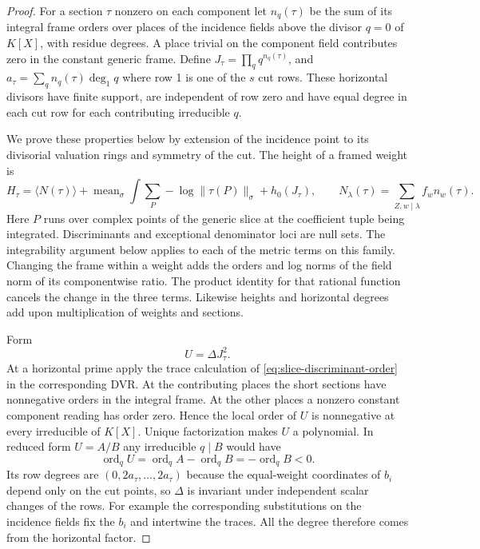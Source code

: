 \begin{proof}
For a section \(\tau\) nonzero on each component let
\(n_q(\tau)\) be the sum of its integral frame orders over
places of the incidence fields above the divisor \(q=0\)
of \(K[X]\), with residue degrees. A place trivial on the
component field contributes zero in the constant generic
frame. Define \(J_\tau=\prod_q q^{n_q(\tau)}\), and
\(a_\tau=\sum_q n_q(\tau)\deg_1 q\) where row 1 is one
of the \(s\) cut rows. These horizontal divisors have finite support, are independent
of row zero and have equal degree in each cut row for each
contributing irreducible \(q\).

We prove these properties
below by extension of the incidence point to its divisorial
valuation rings and symmetry of the cut. The height of a framed
weight is
\[
 H_\tau=\langle N(\tau)\rangle
       +\operatorname{mean}_{\sigma}\int
            \sum_{P}-\log\|\tau(P)\|_\sigma
       +h_0(J_\tau),\qquad
 N_\lambda(\tau)=\sum_{Z,w\mid\lambda} f_w n_w(\tau).
\]
Here \(P\) runs over complex points of the generic slice
at the coefficient tuple being integrated. Discriminants
and exceptional denominator loci are null sets. The integrability argument below applies to each of the
metric terms on this family.
Changing the frame within a weight adds the orders and
log norms of the field norm of its componentwise ratio.
The product identity for that rational function cancels
the change in the three terms. Likewise heights and
horizontal degrees add upon multiplication of weights
and sections. \label{cor:slice-heights-1}

Form 
\[
  U=\Delta J_\tau^2.
\]
 At a horizontal prime apply
the trace calculation of \eqref{eq:slice-discriminant-order}
in the corresponding DVR. At the contributing places the
short sections have nonnegative orders in the integral
frame. At the other places a nonzero constant component
reading has order zero. Hence the local order of \(U\)
is nonnegative at every irreducible of \(K[X]\). Unique
factorization makes \(U\) a polynomial.
In reduced form \(U=A/B\) any irreducible \(q\mid B\) would have
\[
  \operatorname{ord}_q U=\operatorname{ord}_q A-\operatorname{ord}_q B=-\operatorname{ord}_q B<0 .
\]
 Its row degrees
are \((0,2a_\tau,\ldots,2a_\tau)\) because the equal-weight
coordinates of \(b_i\) depend only on the cut points, so \(\Delta\) is invariant under
independent scalar changes of the rows. For example the
corresponding substitutions on the incidence fields fix the
\(b_i\) and intertwine the traces. All the degree therefore
comes from the horizontal factor.


\end{proof}
